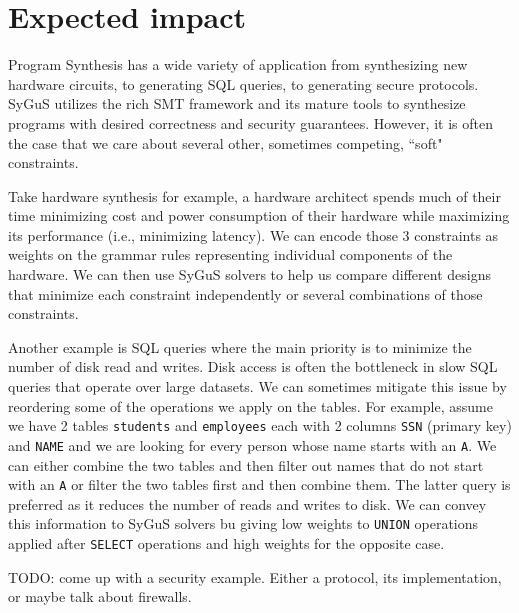 \section{Expected impact}
\label{sec:impact}
Program Synthesis has a wide variety of application from synthesizing new hardware circuits, to generating SQL queries, to generating secure protocols.
%
SyGuS utilizes the rich SMT framework and its mature tools to synthesize programs with desired correctness and security guarantees.
%
However, it is often the case that we care about several other, sometimes competing, ``soft" constraints.
%

Take hardware synthesis for example, a hardware architect spends much of their time minimizing cost and power consumption of their hardware while maximizing its performance (i.e., minimizing latency).
%
We can encode those 3 constraints as weights on the grammar rules representing individual components of the hardware.
%
We can then use SyGuS solvers to help us compare different designs that minimize each constraint independently or several combinations of those constraints.
%

Another example is SQL queries where the main priority is to minimize the number of disk read and writes.
%
Disk access is often the bottleneck in slow SQL queries that operate over large datasets.
%
We can sometimes mitigate this issue by reordering some of the operations we apply on the tables.
%
For example, assume we have 2 tables \texttt{students} and \texttt{employees} each with 2 columns \texttt{SSN} (primary key) and \texttt{NAME} and we are looking for every person whose name starts with an \texttt{A}. We can either combine the two tables and then filter out names that do not start with an \texttt{A} or filter the two tables first and then combine them. The latter query is preferred as it reduces the number of reads and writes to disk. We can convey this information to SyGuS solvers bu giving low weights to \texttt{UNION} operations applied after \texttt{SELECT} operations and high weights for the opposite case.
%

TODO: come up with a security example. Either a protocol, its implementation, or maybe talk about firewalls.
